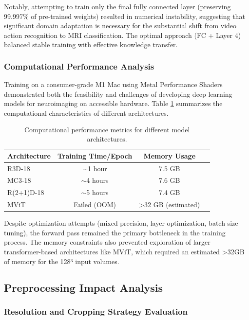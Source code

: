 \documentclass[11pt, a4paper]{article}
\begin{document}
Notably, attempting to train only the final fully connected layer (preserving 99.997\% of pre-trained weights) resulted in numerical instability, suggesting that significant domain adaptation is necessary for the substantial shift from video action recognition to MRI classification. The optimal approach (FC + Layer 4) balanced stable training with effective knowledge transfer.

\subsubsection{Computational Performance Analysis}

Training on a consumer-grade M1 Mac using Metal Performance Shaders demonstrated both the feasibility and challenges of developing deep learning models for neuroimaging on accessible hardware. Table \ref{tab:computational_performance} summarizes the computational characteristics of different architectures.

\begin{table}[htbp]
\centering
\begin{tabular}{|l|c|c|c|}
\hline
\textbf{Architecture} & \textbf{Training Time/Epoch} & \textbf{Memory Usage} \\
\hline
R3D-18 & $\sim$1 hour & 7.5 GB \\
\hline
MC3-18 & $\sim$4 hours & 7.6 GB \\
\hline
R(2+1)D-18 & $\sim$5 hours & 7.4 GB \\
\hline
MViT & Failed (OOM) & >32 GB (estimated) \\
\hline
\end{tabular}
\caption{Computational performance metrics for different model architectures.}
\label{tab:computational_performance}
\end{table}

Despite optimization attempts (mixed precision, layer optimization, batch size tuning), the forward pass remained the primary bottleneck in the training process. The memory constraints also prevented exploration of larger transformer-based architectures like MViT, which required an estimated >32GB of memory for the 128³ input volumes.

\subsection{Preprocessing Impact Analysis}

\subsubsection{Resolution and Cropping Strategy Evaluation}
\end{document}
